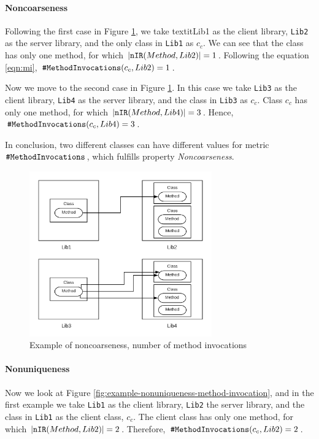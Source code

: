 \paragraph{Noncoarseness}
Following the first case in Figure \ref{fig:example-noncoarseness-method-invocation}, we take textit{Lib1} as the client library, \texttt{Lib2} as the server library, and the only class in \texttt{Lib1} as $c_c$. We can see that the class has only one method, for which $|\verb|nIR|(Method, Lib2)| = 1$. Following the equation \ref{eqn:mi}, $\verb|#MethodInvocations|(c_c, Lib2) = 1$.

Now we move to the second case in Figure \ref{fig:example-noncoarseness-method-invocation}. In this case we take \texttt{Lib3} as the client library, \texttt{Lib4} as the server library, and the class in \texttt{Lib3} as $c_c$. Class $c_c$ has only one method, for which $|\verb|nIR|(Method, Lib4)| = 3$. Hence, $\verb|#MethodInvocations|(c_c, Lib4) = 3$.

In conclusion, two different classes can have different values for metric $\verb|#MethodInvocations|$, which fulfills property \textit{Noncoarseness}.

\begin{figure}[ht]
\begin{center}
\includegraphics[width=0.7\textwidth]{figures/Example-Distribution-1.png}
\caption{Example of noncoarseness, number of method invocations}
\label{fig:example-noncoarseness-method-invocation}
\end{center}
\end{figure}

\paragraph{Nonuniqueness}
Now we look at Figure \ref{fig:example-nonuniqueness-method-invocation}, and in the first example we take \texttt{Lib1} as the client library, \texttt{Lib2} the server library, and the class in \texttt{Lib1} as the client class, $c_c$. The client class has only one method, for which $|\verb|nIR|(Method, Lib2)| = 2$. Therefore, $\verb|#MethodInvocations|(c_c, Lib2) = 2$.

